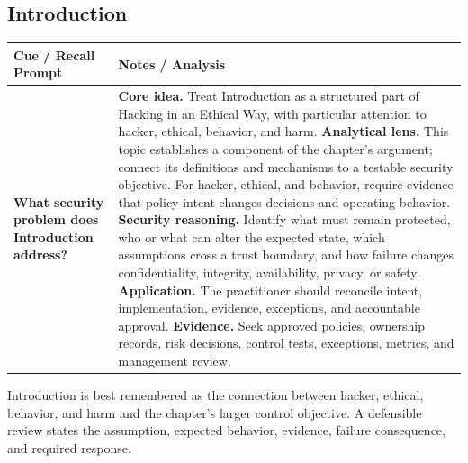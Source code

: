 \documentclass[11pt]{article}
\newcommand{\CornellHeader}{%
\rowcolor{Navy}\color{white}\bfseries Cue / Recall Prompt & \color{white}\bfseries Notes / Analysis\\\hline}
\newcommand{\CornellRow}[2]{%
\cellcolor{CueGray}\RaggedRight\textbf{#1} & \RaggedRight #2\\\hline}
\begin{document}
\subsection*{Introduction}
\begin{longtable}{>{\RaggedRight\arraybackslash}p{}|>{\RaggedRight\arraybackslash}p{}}
\CornellHeader
\CornellRow{What security problem does Introduction address?}{\textbf{Core idea.} Treat Introduction as a structured part of Hacking in an Ethical Way, with particular attention to hacker, ethical, behavior, and harm. \textbf{Analytical lens.} This topic establishes a component of the chapter's argument; connect its definitions and mechanisms to a testable security objective. For hacker, ethical, and behavior, require evidence that policy intent changes decisions and operating behavior. \textbf{Security reasoning.} Identify what must remain protected, who or what can alter the expected state, which assumptions cross a trust boundary, and how failure changes confidentiality, integrity, availability, privacy, or safety. \textbf{Application.} The practitioner should reconcile intent, implementation, evidence, exceptions, and accountable approval. \textbf{Evidence.} Seek approved policies, ownership records, risk decisions, control tests, exceptions, metrics, and management review.}
\end{longtable}
\begin{topicsummary}
Introduction is best remembered as the connection between hacker, ethical, behavior, and harm and the chapter's larger control objective. A defensible review states the assumption, expected behavior, evidence, failure consequence, and required response.
\end{topicsummary}
\end{document}
